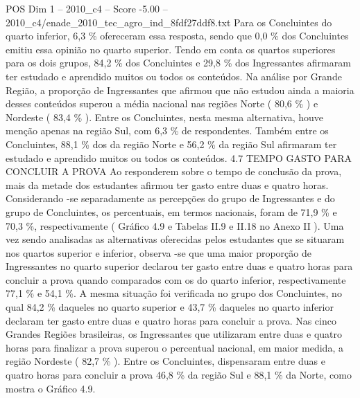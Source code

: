 \begin{textsample}{POS Dim 1 – 2010\_c4 – Score -5.00 – 2010\_c4/enade\_2010\_tec\_agro\_ind\_8fdf27ddf8.txt}
Para os Concluintes do quarto inferior, 6,3 \% ofereceram essa resposta, sendo que 0,0 \% dos Concluintes emitiu essa opinião no quarto superior.
Tendo em conta os quartos superiores para os dois grupos, 84,2 \% dos Concluintes e 29,8 \% dos Ingressantes afirmaram ter estudado e aprendido muitos ou todos os conteúdos.
Na análise por Grande Região, a proporção de Ingressantes que afirmou que não estudou ainda a maioria desses conteúdos superou a média nacional nas regiões Norte ( 80,6 \% ) e Nordeste ( 83,4 \% ).
Entre os Concluintes, nesta mesma alternativa, houve menção apenas na região Sul, com 6,3 \% de respondentes.
Também entre os Concluintes, 88,1 \% dos da região Norte e 56,2 \% da região Sul afirmaram ter estudado e aprendido muitos ou todos os conteúdos. 4.7 TEMPO GASTO PARA CONCLUIR A PROVA Ao responderem sobre o tempo de conclusão da prova, mais da metade dos estudantes afirmou ter gasto entre duas e quatro horas.
Considerando -se separadamente as percepções do grupo de Ingressantes e do grupo de Concluintes, os percentuais, em termos nacionais, foram de 71,9 \% e 70,3 \%, respectivamente ( Gráfico 4.9 e Tabelas II.9 e II.18 no Anexo II ).
Uma vez sendo analisadas as alternativas oferecidas pelos estudantes que se situaram nos quartos superior e inferior, observa -se que uma maior proporção de Ingressantes no quarto superior declarou ter gasto entre duas e quatro horas para concluir a prova quando comparados com os do quarto inferior, respectivamente 77,1 \% e 54,1 \%.
A mesma situação foi verificada no grupo dos Concluintes, no qual 84,2 \% daqueles no quarto superior e 43,7 \% daqueles no quarto inferior declaram ter gasto entre duas e quatro horas para concluir a prova.
Nas cinco Grandes Regiões brasileiras, os Ingressantes que utilizaram entre duas e quatro horas para finalizar a prova superou o percentual nacional, em maior medida, a região Nordeste ( 82,7 \% ).
Entre os Concluintes, dispensaram entre duas e quatro horas para concluir a prova 46,8 \% da região Sul e 88,1 \% da Norte, como mostra o Gráfico 4.9.

\end{textsample}
